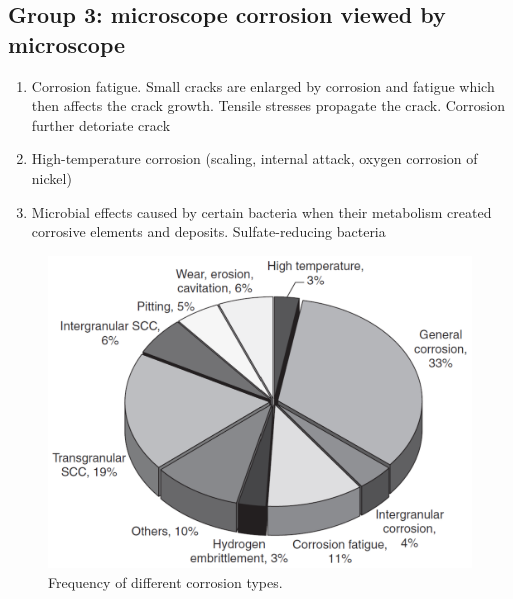 \subsection{Group 3: microscope corrosion viewed by microscope}
\begin{enumerate}
    \item Corrosion fatigue. Small cracks are enlarged by corrosion and fatigue which then affects the crack growth. Tensile stresses propagate the crack. Corrosion further detoriate crack
    \item High-temperature corrosion (scaling, internal attack, oxygen corrosion of nickel)
    \item Microbial effects caused by certain bacteria when their metabolism created corrosive elements and deposits. Sulfate-reducing bacteria
\end{enumerate}
\begin{figure}[H]
    \centering
    \includegraphics[width = \textwidth]{img/figure74.png}
    \caption{Frequency of different corrosion types.}
\end{figure}